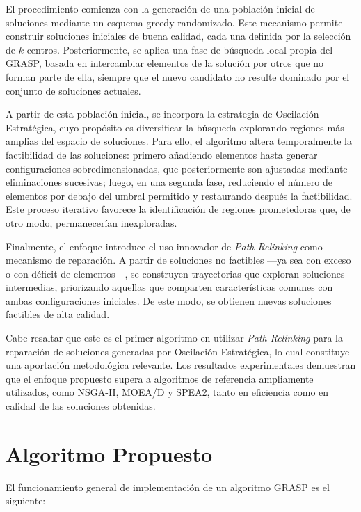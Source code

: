 \documentclass[12pt,a4paper]{book}
\begin{document}
El procedimiento comienza con la generación de una población inicial de soluciones mediante un esquema greedy randomizado. Este mecanismo permite construir soluciones iniciales de buena calidad, cada una definida por la selección de $k$ centros. Posteriormente, se aplica una fase de búsqueda local propia del GRASP, basada en intercambiar elementos de la solución por otros que no forman parte de ella, siempre que el nuevo candidato no resulte dominado por el conjunto de soluciones actuales.

A partir de esta población inicial, se incorpora la estrategia de Oscilación Estratégica, cuyo propósito es diversificar la búsqueda explorando regiones más amplias del espacio de soluciones. Para ello, el algoritmo altera temporalmente la factibilidad de las soluciones: primero añadiendo elementos hasta generar configuraciones sobredimensionadas, que posteriormente son ajustadas mediante eliminaciones sucesivas; luego, en una segunda fase, reduciendo el número de elementos por debajo del umbral permitido y restaurando después la factibilidad.
Este proceso iterativo favorece la identificación de regiones prometedoras que, de otro modo, permanecerían inexploradas.

Finalmente, el enfoque introduce el uso innovador de \emph{Path Relinking} como mecanismo de reparación. A partir de soluciones no factibles —ya sea con exceso o con déficit de elementos—, se construyen trayectorias que exploran soluciones intermedias, priorizando aquellas que comparten características comunes con ambas configuraciones iniciales. De este modo, se obtienen nuevas soluciones factibles de alta calidad.

Cabe resaltar que este es el primer algoritmo en utilizar \emph{Path Relinking} para la reparación de soluciones generadas por Oscilación Estratégica, lo cual constituye una aportación metodológica relevante. Los resultados experimentales demuestran que el enfoque propuesto supera a algoritmos de referencia ampliamente utilizados, como NSGA-II, MOEA/D y SPEA2, tanto en eficiencia como en calidad de las soluciones obtenidas.

\section{Algoritmo Propuesto}
El funcionamiento general de implementación de un algoritmo GRASP es el siguiente:
\end{document}
